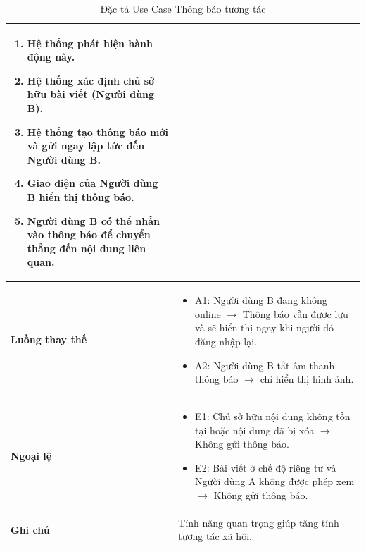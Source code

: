 \begin{table}[H]
\begin{tabularx}{\textwidth}{|l|X|}
\begin{enumerate}
    \item Hệ thống phát hiện hành động này.
    \item Hệ thống xác định chủ sở hữu bài viết (Người dùng B).
    \item Hệ thống tạo thông báo mới và gửi ngay lập tức đến Người dùng B.
    \item Giao diện của Người dùng B hiển thị thông báo.
    \item Người dùng B có thể nhấn vào thông báo để chuyển thẳng đến nội dung liên quan.
\end{enumerate} \\ \hline
\textbf{Luồng thay thế} & 
\begin{itemize}
    \item A1: Người dùng B đang không online $\rightarrow$ Thông báo vẫn được lưu và sẽ hiển thị ngay khi người đó đăng nhập lại.
    \item A2: Người dùng B tắt âm thanh thông báo $\rightarrow$ chỉ hiển thị hình ảnh.
\end{itemize} \\ \hline
\textbf{Ngoại lệ} & 
\begin{itemize}
    \item E1: Chủ sở hữu nội dung không tồn tại hoặc nội dung đã bị xóa $\rightarrow$ Không gửi thông báo.
    \item E2: Bài viết ở chế độ riêng tư và Người dùng A không được phép xem $\rightarrow$ Không gửi thông báo.
\end{itemize} \\ \hline
\textbf{Ghi chú} & Tính năng quan trọng giúp tăng tính tương tác xã hội. \\ \hline
\end{tabularx}
\caption{Đặc tả Use Case Thông báo tương tác}
\end{table}

